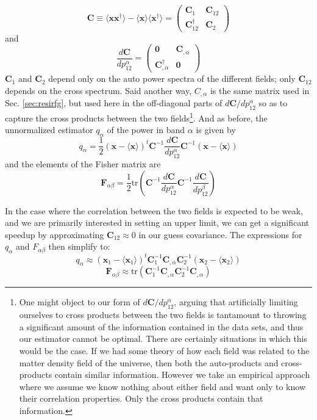 \documentclass[numberedappendix]{emulateapj}
\newcommand{\Fb}{\mathbf{F}}
\newcommand{\Cb}{\mathbf{C}}
\newcommand{\xb}{\mathbf{x}}
\begin{document}
\begin{equation}
\Cb\equiv  \langle\xb\xb^\dagger\rangle-\langle\xb\rangle\langle\xb^\dagger\rangle=\left(\begin{matrix}\Cb_1 & \Cb_{12} \\ \Cb_{12}^\dagger & \Cb_2   \end{matrix}\right)
\end{equation}
and 
\begin{equation}
\frac{d\Cb}{dp_{12}^\alpha}=\left(\begin{matrix}\mathbf{0} & \Cb_{,\alpha}\\ \Cb_{,\alpha}^\dagger & \mathbf{0}   \end{matrix}\right)
\end{equation}
$\Cb_1$ and $\Cb_2$ depend only on the auto power spectra of the different fields; only $\Cb_{12}$ depends on the cross spectrum. Said another way, $C_{,\alpha}$ is the same matrix used in Sec. \ref{sec:resirfg}, but used here in the off-diagonal parts of $d\Cb/dp_{12}^\alpha$ so as to capture the cross products between the two fields\footnote{One might object to our form of $d\Cb/dp_{12}^\alpha$, arguing that artificially limiting ourselves to cross products between the two fields is tantamount to throwing a significant amount of the information contained in the data sets, and thus our estimator cannot be optimal. There are certainly situations in which this would be the case. If we had some theory of how each field was related to the matter density field of the universe, then both the auto-products and cross-products contain similar information. However we take an empirical approach where we assume we know nothing about either field and want only to know their correlation properties. Only the cross products contain that information.}. And as before, the unnormalized estimator $q_\alpha$ of the power in band $\alpha$ is given by
\begin{equation}
q_\alpha = \frac{1}{2}(\xb-\langle\xb\rangle)^t \Cb^{-1} \frac{d\Cb}{dp_{12}^\alpha}\Cb^{-1}(\xb-\langle\xb\rangle)
\end{equation}
and the elements of the Fisher matrix are
\begin{equation}
\Fb_{\alpha\beta}=\frac{1}{2}\text{tr}\left(\Cb^{-1} \frac{d\Cb}{dp_{12}^\alpha} \Cb^{-1}  \frac{d\Cb}{dp_{12}^\beta}  \right)	
\end{equation}

In the case where the correlation between the two fields is expected to be weak, and we are primarily interested in setting an upper limit, we can get a significant speedup by approximating $\Cb_{12}\approx0$ in our guess covariance. The expressions for $q_\alpha$ and $F_{\alpha\beta}$ then simplify to:
\begin{equation}
q_\alpha \approx (\xb_1-\langle\xb_1\rangle)^t \Cb_1^{-1} \Cb_{,\alpha}\Cb_2^{-1}(\xb_2-\langle\xb_2\rangle)
\end{equation}
\begin{equation}
\Fb_{\alpha\beta}\approx\text{tr}\left(\Cb_1^{-1} \Cb_{,\alpha} \Cb_2^{-1}  \Cb_{,\alpha}  \right)	
\end{equation}
\end{document}
